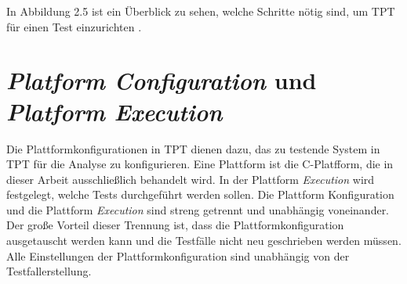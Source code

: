 In Abbildung 2.5 ist ein Überblick zu sehen, welche Schritte nötig sind, um TPT für einen Test einzurichten \cite[vgl.][S. 39]{userguide}. 

\newpage
\section*{\textit{Platform Configuration} und \textit{Platform Execution}}
Die Plattformkonfigurationen in TPT dienen dazu, das zu testende System in TPT für die Analyse zu konfigurieren.
Eine Plattform ist die C-Platfform, die in dieser Arbeit ausschließlich behandelt wird.
In der Plattform \textit{Execution} wird festgelegt, welche Tests durchgeführt werden sollen.
Die Plattform Konfiguration und die Plattform \textit{Execution} sind streng getrennt und unabhängig voneinander.
Der große Vorteil dieser Trennung ist, dass die Plattformkonfiguration ausgetauscht werden kann und die Testfälle nicht neu geschrieben
werden müssen. Alle Einstellungen der Plattformkonfiguration sind unabhängig von der Testfallerstellung\cite[vgl.][S. 120]{tpt}. 

